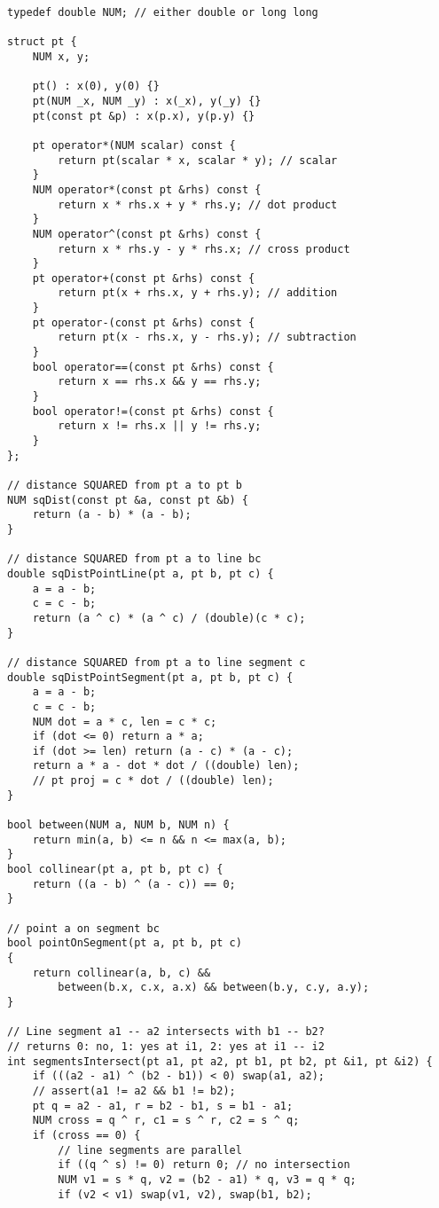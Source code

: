 \documentclass{article}
\begin{document}
\begin{lstlisting}
typedef double NUM; // either double or long long

struct pt {
	NUM x, y;
	
	pt() : x(0), y(0) {}
	pt(NUM _x, NUM _y) : x(_x), y(_y) {}
	pt(const pt &p) : x(p.x), y(p.y) {}
	
	pt operator*(NUM scalar) const {
		return pt(scalar * x, scalar * y); // scalar
	}
	NUM operator*(const pt &rhs) const {
		return x * rhs.x + y * rhs.y; // dot product
	}
	NUM operator^(const pt &rhs) const {
		return x * rhs.y - y * rhs.x; // cross product
	}
	pt operator+(const pt &rhs) const {
		return pt(x + rhs.x, y + rhs.y); // addition
	}
	pt operator-(const pt &rhs) const {
		return pt(x - rhs.x, y - rhs.y); // subtraction
	}
	bool operator==(const pt &rhs) const {
		return x == rhs.x && y == rhs.y;
	}
	bool operator!=(const pt &rhs) const {
		return x != rhs.x || y != rhs.y;
	}
};

// distance SQUARED from pt a to pt b
NUM sqDist(const pt &a, const pt &b) {
	return (a - b) * (a - b);
}

// distance SQUARED from pt a to line bc
double sqDistPointLine(pt a, pt b, pt c) {
	a = a - b;
	c = c - b;
	return (a ^ c) * (a ^ c) / (double)(c * c);
}

// distance SQUARED from pt a to line segment c
double sqDistPointSegment(pt a, pt b, pt c) {
	a = a - b;
	c = c - b;
	NUM dot = a * c, len = c * c;
	if (dot <= 0) return a * a;
	if (dot >= len) return (a - c) * (a - c);
	return a * a - dot * dot / ((double) len);
	// pt proj = c * dot / ((double) len);
}

bool between(NUM a, NUM b, NUM n) {
	return min(a, b) <= n && n <= max(a, b);
}
bool collinear(pt a, pt b, pt c) {
	return ((a - b) ^ (a - c)) == 0;
}

// point a on segment bc
bool pointOnSegment(pt a, pt b, pt c)
{
	return collinear(a, b, c) &&
		between(b.x, c.x, a.x) && between(b.y, c.y, a.y);
}

// Line segment a1 -- a2 intersects with b1 -- b2?
// returns 0: no, 1: yes at i1, 2: yes at i1 -- i2
int segmentsIntersect(pt a1, pt a2, pt b1, pt b2, pt &i1, pt &i2) {
	if (((a2 - a1) ^ (b2 - b1)) < 0) swap(a1, a2);
	// assert(a1 != a2 && b1 != b2);
	pt q = a2 - a1, r = b2 - b1, s = b1 - a1;
	NUM cross = q ^ r, c1 = s ^ r, c2 = s ^ q;
	if (cross == 0) {
		// line segments are parallel
		if ((q ^ s) != 0) return 0; // no intersection
		NUM v1 = s * q, v2 = (b2 - a1) * q, v3 = q * q;
		if (v2 < v1) swap(v1, v2), swap(b1, b2);


\end{lstlisting}
\end{document}
